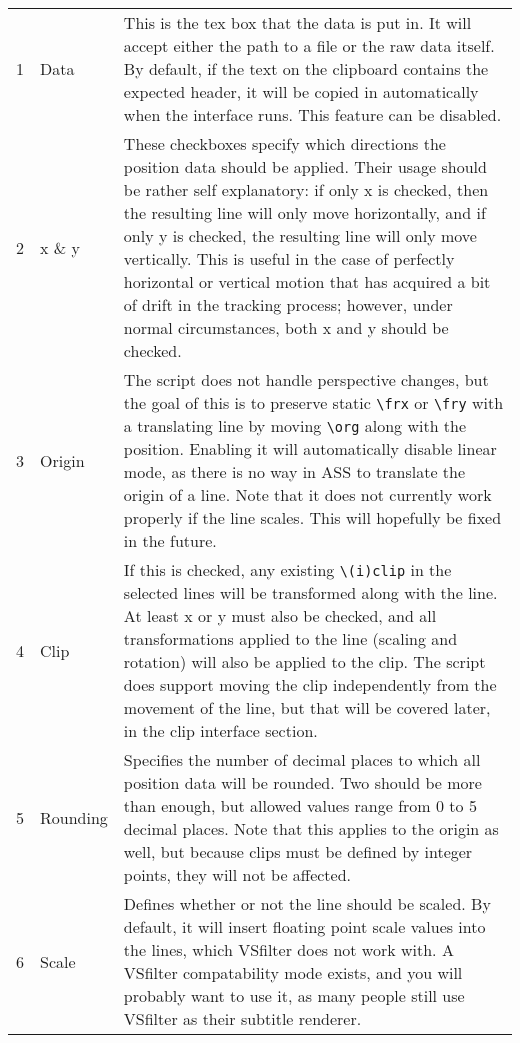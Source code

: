 ﻿\documentclass[a4paper,12pt]{article}
\begin{document}
  \begin{center}
    \begin{longtable}{rlp{11cm}}
      1 & Data & This is the tex box that the data is put in. It will accept either the path to a file or the raw data itself. By default, if the text on the clipboard contains the expected header, it will be copied in automatically when the interface runs. This feature can be disabled. \\
      2 & x \& y & These checkboxes specify which directions the position data should be applied. Their usage should be rather self explanatory: if only x is checked, then the resulting line will only move horizontally, and if only y is checked, the resulting line will only move vertically. This is useful in the case of perfectly horizontal or vertical motion that has acquired a bit of drift in the tracking process; however, under normal circumstances, both x and y should be checked. \\
      3 & Origin & The script does not handle perspective changes, but the goal of this is to preserve static {\tt\textbackslash{}frx} or {\tt\textbackslash{}fry} with a translating line by moving {\tt\textbackslash{}org} along with the position. Enabling it will automatically disable linear mode, as there is no way in ASS to translate the origin of a line. Note that it does not currently work properly if the line scales. This will hopefully be fixed in the future.\\
      4 & Clip & If this is checked, any existing {\tt\textbackslash{}(i)clip} in the selected lines will be transformed along with the line. At least x or y must also be checked, and all transformations applied to the line (scaling and rotation) will also be applied to the clip. The script does support moving the clip independently from the movement of the line, but that will be covered later, in the clip interface section. \\ %
      5 & Rounding & Specifies the number of decimal places to which all position data will be rounded. Two should be more than enough, but allowed values range from 0 to 5 decimal places. Note that this applies to the origin as well, but because clips must be defined by integer points, they will not be affected. \\
      6 & Scale & Defines whether or not the line should be scaled. By default, it will insert floating point scale values into the lines, which VSfilter does not work with. A VSfilter compatability mode exists, and you will probably want to use it, as many people still use VSfilter as their subtitle renderer. \\

\end{longtable}
\end{center}
\end{document}
